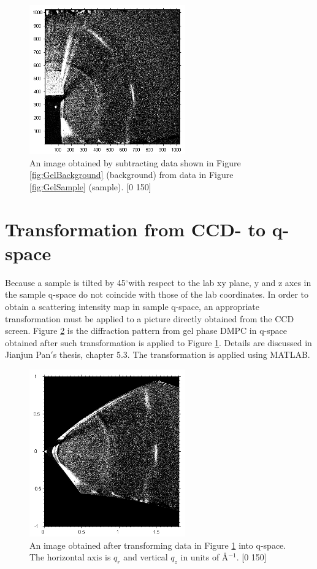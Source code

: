 \documentclass[letterpaper,12pt]{article}
\newcommand{\dg}{$^{\circ}$}%
\begin{document}
\begin{figure}[htbp]
	\centering
	\includegraphics[width=0.6\textwidth]{gel_t52}
	\caption[gel phase DMPC after light background subtraction]{An image obtained by subtracting data shown in Figure \ref{fig:GelBackground} (background) from data in Figure \ref{fig:GelSample} (sample). [0 150]}
	\label{fig:GelCCD}
\end{figure}

\newpage
\section{Transformation from CCD- to q-space}
Because a sample is tilted by 45\dg with respect to the lab xy plane, y and z axes in the sample q-space do not coincide with those of the lab coordinates. In order to obtain a scattering intensity map in  sample q-space, an appropriate transformation must be applied to a picture directly obtained from the CCD screen. Figure \ref{fig:GelTrans} is the diffraction pattern from gel phase DMPC in q-space obtained after such transformation is applied to Figure \ref{fig:GelCCD}. Details are discussed in Jianjun Pan$'$s thesis, chapter 5.3. The transformation is applied using MATLAB. 
\begin{figure}[htbp]
	\centering
	\includegraphics[width=0.6\textwidth]{gel_t52_trans}
	\caption[Gel phase pattern in q-space]{An image obtained after transforming data in Figure \ref{fig:GelCCD} into q-space. The horizontal axis is $q_r$ and vertical $q_z$ in units of \AA$^{-1}$. [0 150]}
	\label{fig:GelTrans}
\end{figure}
\end{document}
